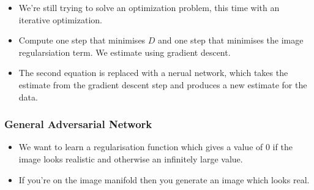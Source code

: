 \documentclass[11pt]{article}
\begin{document}
\begin{minipage}[l]{.5\linewidth}
    \begin{figure}[H]
        \centering
        
    \end{figure}    
\end{minipage}\hfill
\begin{minipage}[r]{.48\linewidth}
    \begin{itemize}
        \item We're still trying to solve an optimization problem, this time with an iterative optimization. 
        \item Compute one step that minimises $D$ and one step that minimises the image regularsiation term. We estimate using gradient descent. 
        \item The second equation is replaced with a nerual network, which takes the estimate from the gradient descent step and produces a new estimate for the data.
    \end{itemize}
\end{minipage}

\subsubsection{General Adversarial Network}

\begin{minipage}[l]{.5\linewidth}
    \begin{figure}[H]
        \centering
    \end{figure}    
\end{minipage}\hfill
\begin{minipage}[r]{.48\linewidth}
    \begin{itemize}
        \item We want to learn a regularisation function which gives a value of 0 if the image looks realistic and otherwise an infinitely large value. 
        \item If you're on the image manifold then you generate an image which looks real.
    \end{itemize}
\end{minipage}
\end{document}
